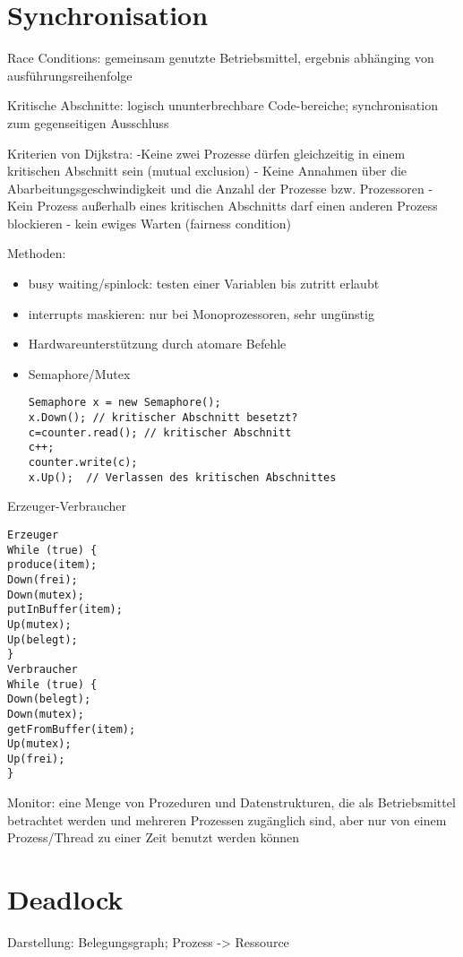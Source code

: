\section*{Synchronisation}
Race Conditions: gemeinsam genutzte Betriebsmittel, ergebnis abhänging von ausführungsreihenfolge

Kritische Abschnitte: logisch ununterbrechbare Code-bereiche; synchronisation zum gegenseitigen Ausschluss

Kriterien von Dijkstra: 
-Keine zwei Prozesse dürfen gleichzeitig in einem kritischen Abschnitt sein (mutual exclusion)
- Keine Annahmen über die Abarbeitungsgeschwindigkeit und die Anzahl der Prozesse bzw. Prozessoren
- Kein Prozess außerhalb eines kritischen Abschnitts darf einen anderen Prozess blockieren 
- kein ewiges Warten (fairness condition)

Methoden:
\begin{itemize}
\item busy waiting/spinlock: testen einer Variablen bis zutritt erlaubt
\item interrupts maskieren: nur bei Monoprozessoren, sehr ungünstig
\item Hardwareunterstützung durch atomare Befehle
\item Semaphore/Mutex
\begin{verbatim}
Semaphore x = new Semaphore();
x.Down(); // kritischer Abschnitt besetzt?
c=counter.read(); // kritischer Abschnitt
c++;
counter.write(c);
x.Up();  // Verlassen des kritischen Abschnittes
\end{verbatim}

\end{itemize}

Erzeuger-Verbraucher
\begin{multicols}{2}
\begin{verbatim}
Erzeuger
While (true) {
produce(item);
Down(frei);
Down(mutex);
putInBuffer(item);
Up(mutex);
Up(belegt);
}
Verbraucher
While (true) {
Down(belegt);
Down(mutex);
getFromBuffer(item);
Up(mutex);
Up(frei);
}
\end{verbatim}
\end{multicols}

Monitor:
eine Menge von Prozeduren und Datenstrukturen, die als
Betriebsmittel betrachtet werden
und mehreren Prozessen zugänglich sind,
aber nur von einem Prozess/Thread zu einer Zeit benutzt
werden können

\section*{Deadlock}
Darstellung: Belegungsgraph; Prozess -> Ressource

